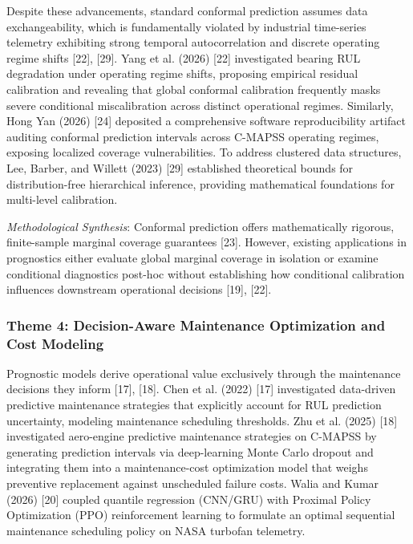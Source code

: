 \documentclass[12pt,a4paper]{article}
\begin{document}
Despite these advancements, standard conformal prediction assumes data exchangeability, which is fundamentally violated by industrial time-series telemetry exhibiting strong temporal autocorrelation and discrete operating regime shifts [22], [29]. Yang et al. (2026) [22] investigated bearing RUL degradation under operating regime shifts, proposing empirical residual calibration and revealing that global conformal calibration frequently masks severe conditional miscalibration across distinct operational regimes. Similarly, Hong Yan (2026) [24] deposited a comprehensive software reproducibility artifact auditing conformal prediction intervals across C-MAPSS operating regimes, exposing localized coverage vulnerabilities. To address clustered data structures, Lee, Barber, and Willett (2023) [29] established theoretical bounds for distribution-free hierarchical inference, providing mathematical foundations for multi-level calibration.

\textit{Methodological Synthesis}: Conformal prediction offers mathematically rigorous, finite-sample marginal coverage guarantees [23]. However, existing applications in prognostics either evaluate global marginal coverage in isolation or examine conditional diagnostics post-hoc without establishing how conditional calibration influences downstream operational decisions [19], [22].

\subsubsection*{Theme 4: Decision-Aware Maintenance Optimization and Cost Modeling}
Prognostic models derive operational value exclusively through the maintenance decisions they inform [17], [18]. Chen et al. (2022) [17] investigated data-driven predictive maintenance strategies that explicitly account for RUL prediction uncertainty, modeling maintenance scheduling thresholds. Zhu et al. (2025) [18] investigated aero-engine predictive maintenance strategies on C-MAPSS by generating prediction intervals via deep-learning Monte Carlo dropout and integrating them into a maintenance-cost optimization model that weighs preventive replacement against unscheduled failure costs. Walia and Kumar (2026) [20] coupled quantile regression (CNN/GRU) with Proximal Policy Optimization (PPO) reinforcement learning to formulate an optimal sequential maintenance scheduling policy on NASA turbofan telemetry.
\end{document}

